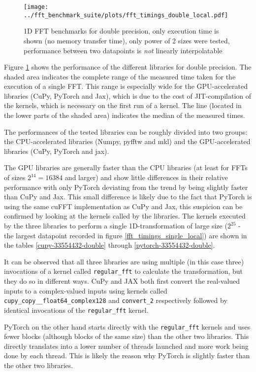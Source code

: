 \documentclass[english,11pt,a4paper,table]{article} %
\begin{document}
\begin{figure}[H]
	\texttt{[image: ../fft\_benchmark\_suite/plots/fft\_timings\_double\_local.pdf]}
	\caption{1D FFT benchmarks for double precision, only execution time is shown (no memory transfer time), only power of 2 sizes were tested, performance between two datapoints is \emph{not} linearly interpolatable}
	\label{fft_timings_double_local}
\end{figure}

Figure \ref{fft_timings_double_local} shows the performance of the different libraries for double precision.
The shaded area indicates the complete range of the measured time taken for the execution of a single FFT.
This range is especially wide for the GPU-accelerated libraries (CuPy, PyTorch and Jax), which is due to the cost of JIT-compilation of the kernels, which is necessary on the first run of a kernel.
The line (located in the lower parts of the shaded area) indicates the median of the measured times. 

The performances of the tested libraries can be roughly divided into two groups: the CPU-accelerated libraries (Numpy, pyfftw and mkl) and the GPU-accelerated libraries (CuPy, PyTorch and jax).

The GPU libraries are generally faster than the CPU libraries (at least for FFTs of sizes $2^{14}=16384$ and larger) and show little differences in their relative performance with only PyTorch deviating from the trend by being slightly faster than CuPy and Jax.
This small difference is likely due to the fact that PyTorch is using the same cuFFT implementation as CuPy and Jax, this suspicion can be confirmed by looking at the kernels called by the libraries.
The kernels executed by the three libraries to perform a single 1D-transformation of large size ($2^{25}$ - the largest datapoint recorded in figure \ref{fft_timings_single_local}) are shown in the tables \ref{cupy-33554432-double} through \ref{pytorch-33554432-double}.

It can be observed that all three libraries are using multiple (in this case three) invocations of a kernel called \texttt{regular\_fft} to calculate the transformation, but they do so in different ways.
CuPy and JAX both first convert the real-valued inputs to a complex-valued inputs using kernels called \texttt{cupy\_copy\_\_float64\_complex128} and \texttt{convert\_2} respectively followed by identical invocations of the \texttt{regular\_fft} kernel.

PyTorch on the other hand starts directly with the \texttt{regular\_fft} kernels and uses fewer blocks (although blocks of the same size) than the other two libraries.
This directly translates into a lower number of threads launched and more work being done by each thread.
This is likely the reason why PyTorch is slightly faster than the other two libraries.
\end{document}
